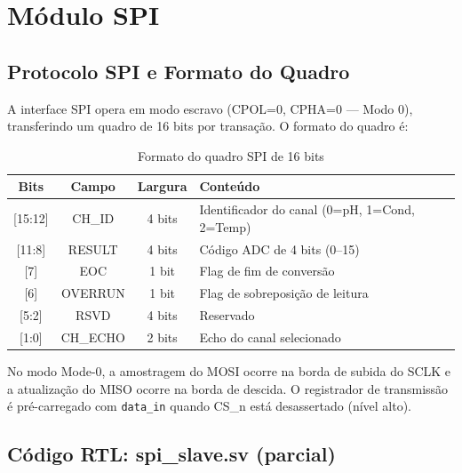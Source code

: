 \documentclass[12pt,a4paper]{article}
\begin{document}
\newpage

\section{Módulo SPI}
\label{sec:spi}

\subsection{Protocolo SPI e Formato do Quadro}

A interface SPI opera em modo escravo (CPOL=0, CPHA=0 — Modo 0), transferindo
um quadro de 16 bits por transação. O formato do quadro é:

\begin{table}[H]
  \centering
  \caption{Formato do quadro SPI de 16 bits}
  \label{tab:spi_frame}
  \begin{tabular}{cccl}
    \toprule
    \textbf{Bits} & \textbf{Campo} & \textbf{Largura} & \textbf{Conteúdo} \\
    \midrule
    {[15:12]} & CH\_ID    & 4 bits & Identificador do canal (0=pH, 1=Cond, 2=Temp) \\
    {[11:8]}  & RESULT    & 4 bits & Código ADC de 4 bits (0--15) \\
    {[7]}     & EOC       & 1 bit  & Flag de fim de conversão \\
    {[6]}     & OVERRUN   & 1 bit  & Flag de sobreposição de leitura \\
    {[5:2]}   & RSVD      & 4 bits & Reservado \\
    {[1:0]}   & CH\_ECHO  & 2 bits & Echo do canal selecionado \\
    \bottomrule
  \end{tabular}
\end{table}

No modo Mode-0, a amostragem do MOSI ocorre na borda de subida do SCLK e
a atualização do MISO ocorre na borda de descida. O registrador de transmissão
é pré-carregado com \texttt{data\_in} quando CS\_n está desassertado (nível alto).

\subsection{Código RTL: spi\_slave.sv (parcial)}
\end{document}
